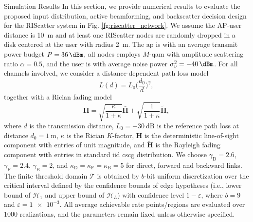 \documentclass[journal]{IEEEtran}
\begin{document}
\begin{section}{Simulation Results}
	In this section, we provide numerical results to evaluate the proposed input distribution, active beamforming, and backscatter decision design for the RIScatter system in Fig. \ref{fg:riscatter_network}.
	We assume the AP-user distance is \qty{10}{\meter} and at least one RIScatter nodes are randomly dropped in a disk centered at the user with radius \qty{2}{\meter}.
	The \gls{ap} is with an average transmit power budget $P=\qty{36}{\dBm}$, all nodes employs $M$-\gls{qam} with amplitude scattering ratio $\alpha=0.5$, and the user is with average noise power $\sigma_v^2=\qty{-40}{\dBm}$.
	For all channels involved, we consider a distance-dependent path loss model
	\begin{equation}
		L(d) = L_0 \biggl(\frac{d_0}{d}\biggr)^\gamma,
	\end{equation}
	together with a Rician fading model
	\begin{equation}
		\boldsymbol{H} = \sqrt{\frac{\kappa}{1+\kappa}} \bar{\boldsymbol{H}} + \sqrt{\frac{1}{1+\kappa}} \tilde{\boldsymbol{H}},
	\end{equation}
	where $d$ is the transmission distance, $L_0=-\qty{30}{\dB}$ is the reference path loss at distance $d_0=\qty{1}{\meter}$, $\kappa$ is the Rician $K$-factor, $\bar{\boldsymbol{H}}$ is the deterministic line-of-sight component with entries of unit magnitude, and $\tilde{\boldsymbol{H}}$ is the Rayleigh fading component with entries in standard \gls{iid} \gls{cscg} distribution.
	We choose $\gamma_{\mathrm{D}}=2.6$, $\gamma_{\mathrm{F}}=2.4$, $\gamma_{\mathrm{B}}=2$, and $\kappa_{\mathrm{D}}=\kappa_{\mathrm{F}}=\kappa_{\mathrm{B}}=5$ for direct, forward and backward links.
	The finite threshold domain $\mathcal{T}$ is obtained by $b$-bit uniform discretization over the critical interval defined by the confidence bounds of edge hypotheses (i.e., lower bound of $\mathcal{H}_1$ and upper bound of $\mathcal{H}_L$) with confidence level $1-\varepsilon$, where $b=9$ and $\varepsilon=\num{1e-3}$.
	All average achievable rate points/regions are evaluated over \num{1000} realizations, and the parameters remain fixed unless otherwise specified.


\end{section}
\end{document}
